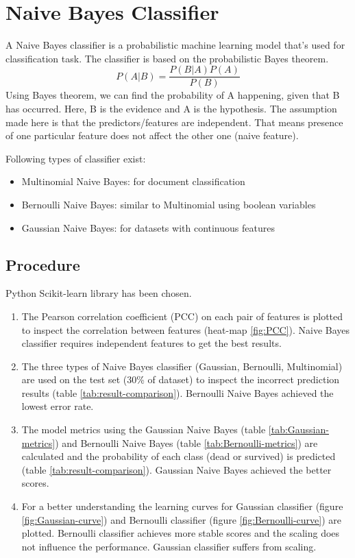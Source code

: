 \documentclass{article}
\begin{document}
\section{Naive Bayes Classifier}
A Naive Bayes classifier is a probabilistic machine learning model that’s used for classification task. The classifier is based on the probabilistic Bayes theorem.
\begin{equation}
\label{eq:bayes-theorem}
P(A|B) = \frac{P(B|A) P(A)}{P(B)}
\end{equation}
Using Bayes theorem, we can find the probability of A happening, given that B has occurred. Here, B is the evidence and A is the hypothesis. The assumption made here is that the predictors/features are independent. That means presence of one particular feature does not affect the other one (naive feature).

\bigskip
Following types of classifier exist:
\begin{itemize}
	\item Multinomial Naive Bayes: for document classification
	\item Bernoulli Naive Bayes: similar to Multinomial using boolean variables
	\item Gaussian Naive Bayes: for datasets with continuous features
\end{itemize}

\subsection{Procedure}
Python Scikit-learn library has been chosen.
\begin{enumerate}  
	\item The Pearson correlation coefficient (PCC) on each pair of features is plotted to inspect the correlation between features (heat-map \ref{fig:PCC}). Naive Bayes classifier requires independent features to get the best results.
	\item The three types of Naive Bayes classifier (Gaussian, Bernoulli, Multinomial) are used on the test set (30\% of dataset) to inspect the incorrect prediction results (table \ref{tab:result-comparison}). Bernoulli Naive Bayes achieved the lowest error rate.
	\item The model metrics using the Gaussian Naive Bayes (table \ref{tab:Gaussian-metrics}) and Bernoulli Naive Bayes (table \ref{tab:Bernoulli-metrics}) are calculated and the probability of each class (dead or survived) is predicted (table \ref{tab:result-comparison}). Gaussian Naive Bayes achieved the better scores.
	\item For a better understanding the learning curves for Gaussian classifier (figure \ref{fig:Gaussian-curve}) and Bernoulli classifier (figure \ref{fig:Bernoulli-curve}) are plotted. Bernoulli classifier achieves more stable scores and the scaling does not influence the performance. Gaussian classifier suffers from scaling.
\end{enumerate}
\end{document}
